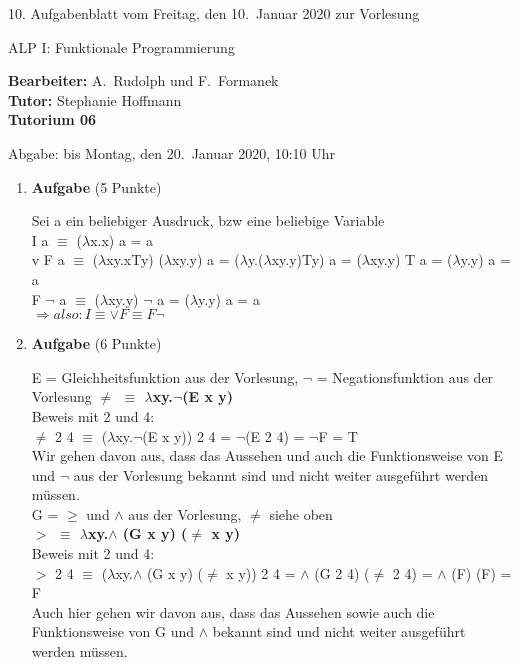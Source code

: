 \documentclass[11pt]{article}
\newcommand{\VORLESUNG}{ALP I: Funktionale Programmierung}
\newcommand{\STAFF}{A.\ Rudolph und F.\ Formanek}
\newcommand{\ASSIGNMENT}{10}
\newcommand{\HANDOUT}{Freitag, den 10.\ Januar   2020}
\newcommand{\TUTOR}{Stephanie Hoffmann}
\newcommand{\DELIVER}{bis Montag, den 20.\ Januar 2020, 10:10 Uhr}
\newcommand{\punkte}[1]{{\small{ }(#1 Punkte)}}
\newcommand{\aufgabe}[1]{\item{\bf #1}}
\begin{document}
\begin{center}
\ASSIGNMENT{}. Aufgabenblatt vom \HANDOUT{} zur Vorlesung 
\vspace*{0.5cm}

{\Large \VORLESUNG{}}

\textbf{Bearbeiter:} \STAFF{}\\
\textbf{Tutor:} \TUTOR\\
\textbf{Tutorium 06}
\vspace*{0.5cm}

{\small Abgabe: \DELIVER{}}
\vspace*{1cm}
\end{center}

\begin{enumerate}
\aufgabe{Aufgabe}\punkte{5}

Sei a ein beliebiger Ausdruck, bzw eine beliebige Variable\\
I a $\equiv$ ($\lambda$x.x) a = a\\
v F a $\equiv$ ($\lambda$xy.xTy) ($\lambda$xy.y) a = ($\lambda$y.($\lambda$xy.y)Ty) a = ($\lambda$xy.y) T  a = ($\lambda$y.y) a = a\\
F $\neg$ a $\equiv$ ($\lambda$xy.y) $\neg$ a = ($\lambda$y.y) a = a\\
$\Rightarrow also: I \equiv \lor F \equiv F\neg$
 
\aufgabe{Aufgabe}\punkte{6}

E = Gleichheitsfunktion aus der Vorlesung, $\neg$ = Negationsfunktion aus der Vorlesung
\textbf{$\neq$ $\equiv$ $\lambda$xy.$\neg$(E x y)}\\
Beweis mit 2 und 4:\\
$\neq$ 2 4 $\equiv$ ($\lambda$xy.$\neg$(E x y)) 2 4 = $\neg$(E 2 4) = $\neg$F = T\\

Wir gehen davon aus, dass das Aussehen und auch die Funktionsweise von E und $\neg$ aus der Vorlesung bekannt sind und nicht weiter ausgeführt werden müssen.\\

G = $\geq$ und $\land$ aus der Vorlesung, $\neq$ siehe oben\\
\textbf{$>$ $\equiv$ $\lambda$xy.$\land$ (G x y) ($\neq$ x y)}\\
Beweis mit 2 und 4:\\
$>$ 2 4 $\equiv$ ($\lambda$xy.$\land$ (G x y) ($\neq$ x y)) 2 4 = $\land$ (G 2 4) ($\neq$ 2 4) = $\land$ (F) (F) = F\\

Auch hier gehen wir davon aus, dass das Aussehen sowie auch die Funktionsweise von G und $\land$ bekannt sind und nicht weiter ausgeführt werden müssen.\\


\end{enumerate}
\end{document}
